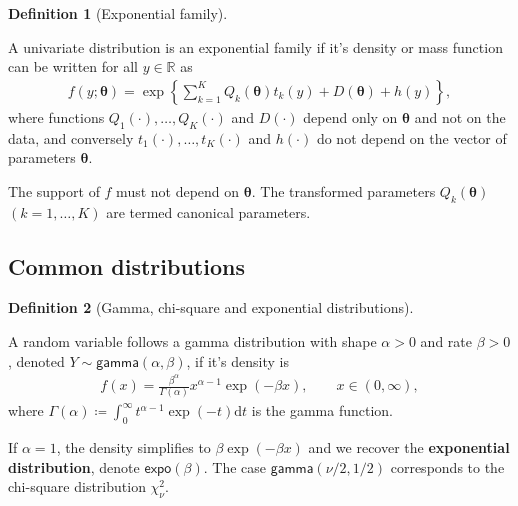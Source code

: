 \documentclass[
  11pt,
  letterpaper,
]{scrbook}
\theoremstyle{definition}
\theoremstyle{definition}
\theoremstyle{definition}
\newtheorem{definition}{Definition}[chapter]
\theoremstyle{plain}
\theoremstyle{plain}
\theoremstyle{remark}
\begin{document}
\begin{definition}[Exponential
family]\protect\hypertarget{def-exponential-family}{}\label{def-exponential-family}

A univariate distribution is an exponential family if it's density or
mass function can be written for all \(y \in \mathbb{R}\) as
\begin{align*}
f(y; \boldsymbol{\theta}) = \exp\left\{ \sum_{k=1}^K Q_k(\boldsymbol{\theta}) t_k(y) + D(\boldsymbol{\theta}) + h(y)\right\}, 
\end{align*} where functions \(Q_1(\cdot), \ldots, Q_K(\cdot)\) and
\(D(\cdot)\) depend only on \(\boldsymbol{\theta}\) and not on the data,
and conversely \(t_1(\cdot), \ldots, t_K(\cdot)\) and \(h(\cdot)\) do
not depend on the vector of parameters \(\boldsymbol{\theta}\).

The support of \(f\) must not depend on \(\boldsymbol{\theta}\). The
transformed parameters \(Q_k(\boldsymbol{\theta})\) \((k=1, \ldots, K)\)
are termed canonical parameters.

\end{definition}

\subsection{Common distributions}\label{common-distributions}

\begin{definition}[Gamma, chi-square and exponential
distributions]\protect\hypertarget{def-gamma}{}\label{def-gamma}

A random variable follows a gamma distribution with shape \(\alpha>0\)
and rate \(\beta>0\), denoted \(Y \sim \mathsf{gamma}(\alpha, \beta)\),
if it's density is \begin{align*}
f(x) = \frac{\beta^\alpha}{\Gamma(\alpha)}x^{\alpha-1}\exp(-\beta x), \qquad x \in (0, \infty),
\end{align*} where
\(\Gamma(\alpha)\coloneqq\int_0^\infty t^{\alpha-1}\exp(-t)\mathrm{d} t\)
is the gamma function.

If \(\alpha=1\), the density simplifies to \(\beta \exp(-\beta x)\) and
we recover the \textbf{exponential distribution}, denote
\(\mathsf{expo}(\beta)\). The case \(\mathsf{gamma}(\nu/2, 1/2)\)
corresponds to the chi-square distribution \(\chi^2_\nu\).

\end{definition}
\end{document}
